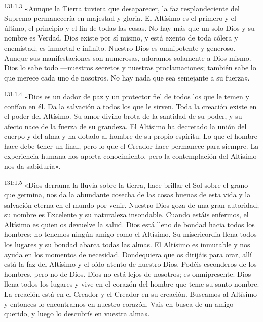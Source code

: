 \par 
\textsuperscript{131:1.3} «Aunque la Tierra tuviera que desaparecer, la faz resplandeciente del Supremo permanecería en majestad y gloria. El Altísimo es el primero y el último, el principio y el fin de todas las cosas. No hay más que un solo Dios y su nombre es Verdad. Dios existe por sí mismo, y está exento de toda cólera y enemistad; es inmortal e infinito. Nuestro Dios es omnipotente y generoso. Aunque sus manifestaciones son numerosas, adoramos solamente a Dios mismo. Dios lo sabe todo ---nuestros secretos y nuestras proclamaciones; también sabe lo que merece cada uno de nosotros. No hay nada que sea semejante a su fuerza».

\par 
\textsuperscript{131:1.4} «Dios es un dador de paz y un protector fiel de todos los que le temen y confían en él. Da la salvación a todos los que le sirven. Toda la creación existe en el poder del Altísimo. Su amor divino brota de la santidad de su poder, y su afecto nace de la fuerza de su grandeza. El Altísimo ha decretado la unión del cuerpo y del alma y ha dotado al hombre de su propio espíritu. Lo que el hombre hace debe tener un final, pero lo que el Creador hace permanece para siempre. La experiencia humana nos aporta conocimiento, pero la contemplación del Altísimo nos da sabiduría».

\par 
\textsuperscript{131:1.5} «Dios derrama la lluvia sobre la tierra, hace brillar el Sol sobre el grano que germina, nos da la abundante cosecha de las cosas buenas de esta vida y la salvación eterna en el mundo por venir. Nuestro Dios goza de una gran autoridad; su nombre es Excelente y su naturaleza insondable. Cuando estáis enfermos, el Altísimo es quien os devuelve la salud. Dios está lleno de bondad hacia todos los hombres; no tenemos ningún amigo como el Altísimo. Su misericordia llena todos los lugares y su bondad abarca todas las almas. El Altísimo es inmutable y nos ayuda en los momentos de necesidad. Dondequiera que os dirijáis para orar, allí está la faz del Altísimo y el oído atento de nuestro Dios. Podéis esconderos de los hombres, pero no de Dios. Dios no está lejos de nosotros; es omnipresente. Dios llena todos los lugares y vive en el corazón del hombre que teme su santo nombre. La creación está en el Creador y el Creador en su creación. Buscamos al Altísimo y entonces lo encontramos en nuestro corazón. Vais en busca de un amigo querido, y luego lo descubrís en vuestra alma».

